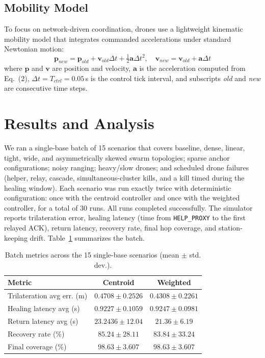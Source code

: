 \documentclass[conference]{IEEEtran}
\begin{document}
\subsection{Mobility Model}
To focus on network-driven coordination, drones use a lightweight kinematic
mobility model that integrates commanded accelerations under standard
Newtonian motion:
\begin{equation}
    \mathbf{p}_{new}=\mathbf{p}_{old}+\mathbf{v}_{old}\Delta t+\tfrac{1}{2}\mathbf{a}\Delta t^2, \quad \mathbf{v}_{new}=\mathbf{v}_{old}+\mathbf{a}\Delta t
\end{equation}
where $\mathbf{p}$ and $\mathbf{v}$ are position and velocity, $\mathbf{a}$ 
is the acceleration computed from Eq.~(2), $\Delta t = T_{ctrl} = 0.05$\,s is the control 
tick interval, and subscripts \textit{old} and \textit{new} are consecutive time steps.

\section{Results and Analysis}
\label{sec:results}
We ran a single-base batch of 15 scenarios that covers baseline, dense,
linear, tight, wide, and asymmetrically skewed swarm topologies; sparse
anchor configurations; noisy ranging; heavy/slow drones; and scheduled
drone failures (helper, relay, cascade, simultaneous-cluster kills, and a
kill timed during the healing window). Each scenario was run exactly twice 
with deterministic configuration: once with the centroid controller and 
once with the weighted controller, for a total of 30 runs. All runs 
completed successfully. The simulator reports
trilateration error, healing latency (time from \texttt{HELP\_PROXY} to
the first relayed ACK), return latency, recovery rate, final hop
coverage, and station-keeping drift. Table~\ref{tab:algo-compare}
summarizes the batch.

\begin{table}[ht]
\caption{Batch metrics across the 15 single-base scenarios (mean $\pm$ std. dev.).}
\label{tab:algo-compare}
\centering
\small
\begin{tabular}{|l|c|c|}
\hline
\textbf{Metric} & \textbf{Centroid} & \textbf{Weighted} \\ \hline
Trilateration avg err. (m) & $0.4708 \pm 0.2526$ & $0.4308 \pm 0.2261$ \\ \hline
Healing latency avg (s)    & $0.9227 \pm 0.1059$ & $0.9247 \pm 0.0981$ \\ \hline
Return latency avg (s)     & $23.2436 \pm 12.04$ & $21.36 \pm 6.19$  \\ \hline
Recovery rate (\%)         & $85.24 \pm 28.11$ & $83.84 \pm 33.24$ \\ \hline
Final coverage (\%)        & $98.63 \pm 3.607$  & $98.63 \pm 3.607$  \\ \hline
\end{tabular}
\end{table}
\end{document}

